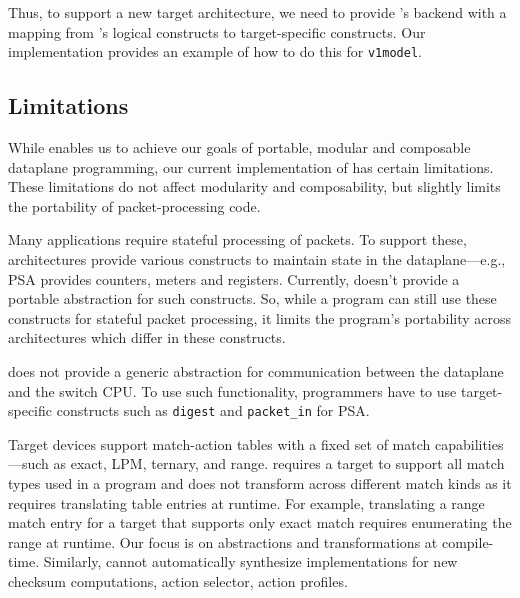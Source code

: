 \documentclass[letterpaper,twocolumn,10pt]{article}
\begin{document}
Thus, to support a new target architecture, we need to provide
\ucomp's backend with a mapping from \uarch's logical constructs to
target-specific constructs. Our implementation provides an example of
how to do this for \texttt{v1model}.





\subsection{Limitations}
\label{sec:limitations}
While \ulang enables us to achieve our goals of portable, modular and
composable dataplane programming, our current implementation of \ucomp
has certain limitations. These limitations do not affect modularity
and composability, but slightly limits the portability of
packet-processing code.

Many applications require stateful processing of packets. To support
these, architectures provide various constructs to maintain state in
the dataplane---e.g., PSA provides counters, meters and registers.
Currently, \uarch doesn't provide a portable abstraction for such
constructs. So, while a \ulang program can still use these constructs
for stateful packet processing, it limits the program's portability
across architectures which differ in these constructs.

\uarch does not provide a generic abstraction for communication
between the dataplane and the switch CPU. To use such functionality,
programmers have to use target-specific constructs such as
\texttt{digest} and \texttt{packet\_in} for PSA.

Target devices support match-action tables with a fixed set of match
capabilities---such as exact, LPM, ternary, and range. \ulang requires
a target to support all match types used in a program and \ucomp does
not transform across different match kinds as it requires translating
table entries at runtime. For example, translating a range match entry
for a target that supports only exact match requires enumerating the
range at runtime.  Our focus is on abstractions and transformations at
compile-time. Similarly, \ulang cannot automatically synthesize
implementations for new checksum computations, action selector, action
profiles.

\end{document}
